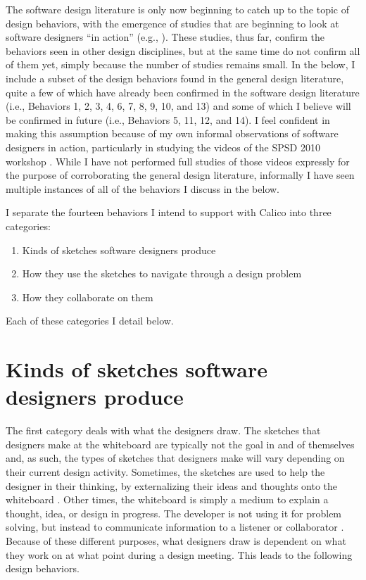 The software design literature is only now beginning to catch up to the topic of design behaviors, with the emergence of studies that are beginning to look at software designers ``in action'' (e.g., \cite{baker2012guest,cherubini2007let,dekel2007notation,petre2009insights}). These studies, thus far, confirm the behaviors seen in other design disciplines, but at the same time do not confirm all of them yet, simply because the number of studies remains small. In the below, I include a subset of the design behaviors found in the general design literature, quite a few of which have already been confirmed in the software design literature (i.e., Behaviors 1, 2, 3, 4, 6, 7, 8, 9, 10, and 13) and some of which I believe will be confirmed in future (i.e., Behaviors 5, 11, 12, and 14). I feel confident in making this assumption because of my own informal observations of software designers in action, particularly in studying the videos of the SPSD 2010 workshop \cite{baker2012guest}. While I have not performed full studies of those videos expressly for the purpose of corroborating the general design literature, informally I have seen multiple instances of all of the behaviors I discuss in the below. 

I separate the fourteen behaviors I intend to support with Calico into three categories:

 \begin{enumerate}
 \item Kinds of sketches software designers produce
 \item How they use the sketches to navigate through a design problem
 \item How they collaborate on them
 \end{enumerate}

Each of these categories I detail below.

\section{Kinds of sketches software designers produce}

The first category deals with what the designers draw. The sketches that designers make at the whiteboard are typically not the goal in and of themselves and, as such, the types of sketches that designers make will vary depending on their current design activity. Sometimes, the sketches are used to help the designer in their thinking, by externalizing their ideas and thoughts onto the whiteboard \cite{lawson1994design}. Other times, the whiteboard is simply a medium to explain a thought, idea, or design in progress. The developer is not using it for problem solving, but instead to communicate information to a listener or collaborator \cite{eugene1992engineering}. Because of these different purposes, what designers draw is dependent on what they work on at what point during a design meeting. This leads to the following design behaviors.

